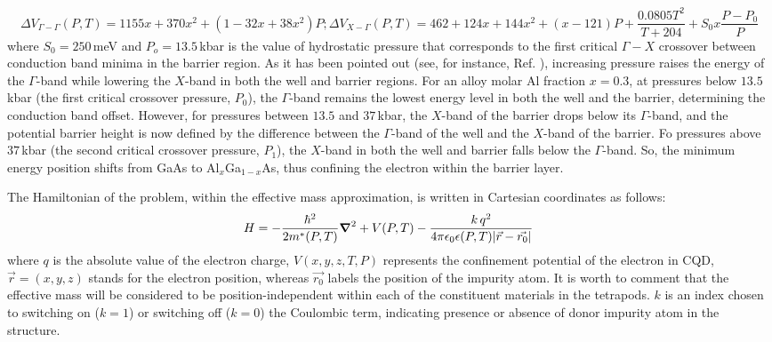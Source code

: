 \documentclass[nanomaterials,article,submit,moreauthors,pdftex]{Definitions/mdpi}
\begin{document}
\begin{subequations}
    \begin{equation}
       \Delta V_{\Gamma-\Gamma}(P,T)  = 1155x+370x^{2}+(1-32x+38x^{2})P;
    \end{equation}
    \begin{equation}
        \Delta V_{X-\Gamma}(P,T) = 462+124x+144x^{2}+(x-121)P+\frac{0.0805T^{2}}{T+204}+S_0x\frac{P-P_0}{P}
    \end{equation}
\end{subequations}
where $S_{0}=250\,$meV and $P_{o}=13.5\,$kbar is the value of hydrostatic pressure that corresponds to the first critical $\Gamma-X$ crossover between conduction band minima in the barrier region. As it has been pointed out (see, for instance, Ref. \cite{Vignesh2020}), increasing pressure raises the energy of the $\Gamma$-band while lowering the $X$-band in both the well and barrier regions. For an alloy molar Al fraction $x=0.3$, at pressures below $13.5\,$kbar (the first critical crossover pressure, $P_0$), the $\Gamma$-band remains the lowest energy level in both the well and the barrier, determining the conduction band offset. However, for pressures between $13.5$ and $37\,$kbar, the $X$-band of the barrier drops below its $\Gamma$-band, and the potential barrier height is now defined by the difference between the $\Gamma$-band of the well and the $X$-band of the barrier. Fo pressures above $37\,$kbar (the second critical crossover pressure, $P_1$), the $X$-band in both the well and barrier falls below the $\Gamma$-band. So, the minimum energy position shifts from GaAs to Al$_x$Ga$_{1-x}$As, thus confining the electron within the barrier layer.

The Hamiltonian of the problem, within the effective mass approximation, is written in Cartesian coordinates as follows:
\begin{equation} \label{Eqt1}
	H= - \frac{\hbar^{2}}{2m^{*}(P,T)}\grad^2 + V(P,T) - \frac{k\,q^{2}}{4\pi \epsilon_{0} \epsilon (P,T) \abs{\vec{r}-\vec{r_{0}}}}\,
\end{equation}
where $q$ is the absolute value of the electron charge, $V(x,y,z,T,P)$ represents the confinement potential of the electron in CQD, $\vec{r}=(x,y,z)$ stands for the electron position, whereas $\vec{r_{0}}$ labels the position of the impurity atom. It is worth to comment that the effective mass will be considered to be position-independent within each of the constituent materials in the tetrapods. $k$ is an index chosen to switching on ($k=1$) or switching off ($k=0$) the Coulombic term, indicating presence or absence of donor impurity atom in the structure.
\end{document}
